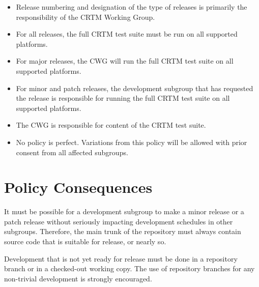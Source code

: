\begin{itemize}
  \item Release numbering and designation of the type of releases is primarily the responsibility of the CRTM Working Group.
  
  \item For all releases, the full CRTM test suite must be run on all supported platforms.  

  \item For major releases, the CWG will run the full CRTM test suite on all supported platforms.

  \item For minor and patch releases, the development subgroup that has requested the release is responsible for running the full CRTM test suite on all supported platforms.  

  \item The CWG is responsible for content of the CRTM test suite.  

  \item No policy is perfect.  Variations from this policy will be allowed with prior consent from all affected subgroups.  
\end{itemize}

\section{Policy Consequences}
It must be possible for a development subgroup to make a minor release or a patch release without seriously impacting development schedules in other subgroups.  Therefore, the main trunk of the repository must always contain source code that is suitable for release, or nearly so.  

Development that is not yet ready for release must be done in a repository branch or in a checked-out working copy.  The use of repository branches for any non-trivial development is strongly encouraged.  



